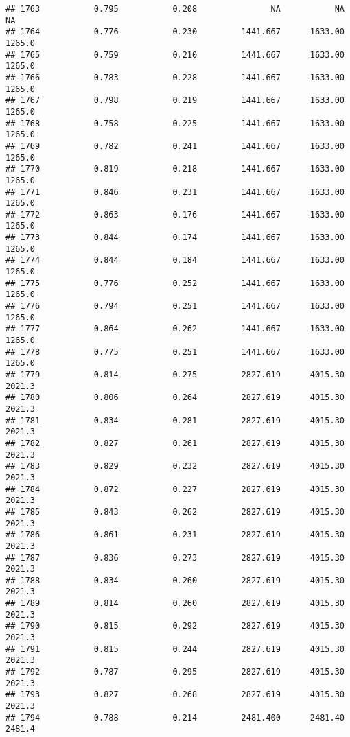 \documentclass[
]{article}
\begin{document}
\begin{verbatim}
## 1763           0.795           0.208               NA           NA           NA
## 1764           0.776           0.230         1441.667      1633.00       1265.0
## 1765           0.759           0.210         1441.667      1633.00       1265.0
## 1766           0.783           0.228         1441.667      1633.00       1265.0
## 1767           0.798           0.219         1441.667      1633.00       1265.0
## 1768           0.758           0.225         1441.667      1633.00       1265.0
## 1769           0.782           0.241         1441.667      1633.00       1265.0
## 1770           0.819           0.218         1441.667      1633.00       1265.0
## 1771           0.846           0.231         1441.667      1633.00       1265.0
## 1772           0.863           0.176         1441.667      1633.00       1265.0
## 1773           0.844           0.174         1441.667      1633.00       1265.0
## 1774           0.844           0.184         1441.667      1633.00       1265.0
## 1775           0.776           0.252         1441.667      1633.00       1265.0
## 1776           0.794           0.251         1441.667      1633.00       1265.0
## 1777           0.864           0.262         1441.667      1633.00       1265.0
## 1778           0.775           0.251         1441.667      1633.00       1265.0
## 1779           0.814           0.275         2827.619      4015.30       2021.3
## 1780           0.806           0.264         2827.619      4015.30       2021.3
## 1781           0.834           0.281         2827.619      4015.30       2021.3
## 1782           0.827           0.261         2827.619      4015.30       2021.3
## 1783           0.829           0.232         2827.619      4015.30       2021.3
## 1784           0.872           0.227         2827.619      4015.30       2021.3
## 1785           0.843           0.262         2827.619      4015.30       2021.3
## 1786           0.861           0.231         2827.619      4015.30       2021.3
## 1787           0.836           0.273         2827.619      4015.30       2021.3
## 1788           0.834           0.260         2827.619      4015.30       2021.3
## 1789           0.814           0.260         2827.619      4015.30       2021.3
## 1790           0.815           0.292         2827.619      4015.30       2021.3
## 1791           0.815           0.244         2827.619      4015.30       2021.3
## 1792           0.787           0.295         2827.619      4015.30       2021.3
## 1793           0.827           0.268         2827.619      4015.30       2021.3
## 1794           0.788           0.214         2481.400      2481.40       2481.4

\end{verbatim}
\end{document}
